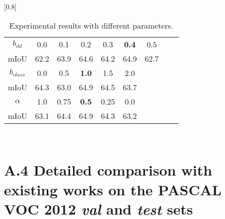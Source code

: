 \documentclass[10pt,twocolumn,letterpaper]{article}
\begin{document}
\begin{table}[hb]
  \begin{center}
\caption{Experimental results with different parameters. \label{hp}}
\scalebox{0.8}[0.8]{
  \begin{tabular}{c|cccccccc}
     \hline
     $b_{dd}$ & 0.0 & 0.1 & 0.2 & 0.3 & \textbf{0.4} & 0.5  \\mIoU & 62.2 & 63.9 & 64.6 & 64.2 & 64.9 & 62.7  \\\hline
     $b_{class}$ & 0.0 & 0.5 & \textbf{1.0} & 1.5 & 2.0 \\ mIoU & 64.3 & 63.0 & 64.9 & 64.5 & 63.7  \\\hline
     $\alpha$ & 1.0 & 0.75 & \textbf{0.5} & 0.25&0.0  \\ mIoU & 63.1 & 64.4 & 64.9 & 64.3  & 63.2  \\\hline
  \end{tabular}
}
\vskip -8mm~
\end{center}
\end{table}

\newpage
\section*{A.4 Detailed comparison with existing works on the PASCAL VOC 2012 {\it val} and {\it test} sets}
\end{document}

